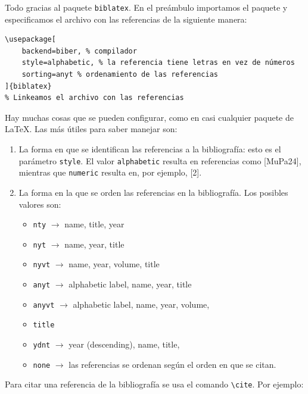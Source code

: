 \documentclass[12pt, spanish]{article}
\theoremstyle{definition} %
\theoremstyle{remark} %
\theoremstyle{plain} %
\theoremstyle{plain} %
\theoremstyle{plain} %
\theoremstyle{plain} %
\theoremstyle{plain} %
\theoremstyle{remark} %
\begin{document}
Todo gracias al paquete \verb|biblatex|. En el preámbulo importamos el paquete y especificamos el archivo con las referencias de la siguiente manera:
\begin{verbatim}
\usepackage[
    backend=biber, % compilador
    style=alphabetic, % la referencia tiene letras en vez de números
    sorting=anyt % ordenamiento de las referencias
]{biblatex}
% Linkeamos el archivo con las referencias

\end{verbatim}
Hay muchas cosas que se pueden configurar, como en casi cualquier paquete de \LaTeX. Las más útiles para saber manejar son:
\begin{enumerate}
    \item La forma en que se identifican las referencias a la bibliografía: esto es el parámetro \verb|style|. El valor \verb|alphabetic| resulta en referencias como [MuPa24], mientras que \verb|numeric| resulta en, por ejemplo, [2].
    \item La forma en la que se orden las referencias en la bibliografía. Los posibles valores son:
    \begin{itemize}
        \item \verb|nty|   $\to$ name, title, year
        \item \verb|nyt|	$\to$ name, year, title
        \item \verb|nyvt|	$\to$ name, year, volume, title
        \item \verb|anyt|	$\to$ alphabetic label, name, year, title
        \item \verb|anyvt|	$\to$ alphabetic label, name, year, volume,
        \item \verb|title|
        \item \verb|ydnt|	$\to$ year (descending), name, title,
        \item \verb|none|	$\to$ las referencias se ordenan según el orden en que se citan.
    \end{itemize}
\end{enumerate}
Para citar una referencia de la bibliografía se usa el comando \verb|\cite|. Por ejemplo:
\begin{center}
    \noindent{}
\end{center}
\end{document}
